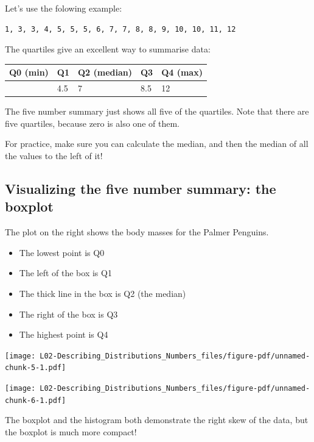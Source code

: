 \documentclass[
  letterpaper,
  DIV=11,
  numbers=noendperiod,
  oneside]{scrreprt}
\providecommand{\tightlist}{%
  \setlength{\itemsep}{0pt}\setlength{\parskip}{0pt}}\usepackage{longtable,booktabs,array}
\begin{document}
Let's use the folowing example:

\begin{verbatim}
1, 3, 3, 4, 5, 5, 5, 6, 7, 7, 8, 8, 9, 10, 10, 11, 12
\end{verbatim}

The quartiles give an excellent way to summarise data:

\begin{longtable}[]{@{}lllll@{}}
\toprule\noalign{}
Q0 (min) & Q1 & Q2 (median) & Q3 & Q4 (max) \\
\midrule\noalign{}
\endhead
\bottomrule\noalign{}
\endlastfoot
1 & 4.5 & 7 & 8.5 & 12 \\
\end{longtable}

The five number summary just shows all five of the quartiles. Note that
there are five quartiles, because zero is also one of them.

For practice, make sure you can calculate the median, and then the
median of all the values to the left of it!

\hypertarget{visualizing-the-five-number-summary-the-boxplot}{%
\subsection{Visualizing the five number summary: the
boxplot}\label{visualizing-the-five-number-summary-the-boxplot}}

\vspace{1cm}

The plot on the right shows the body masses for the Palmer Penguins.

\begin{itemize}
\tightlist
\item
  The lowest point is Q0
\item
  The left of the box is Q1
\item
  The thick line in the box is Q2 (the median)
\item
  The right of the box is Q3
\item
  The highest point is Q4
\end{itemize}

\texttt{[image: L02-Describing\_Distributions\_Numbers\_files/figure-pdf/unnamed-chunk-5-1.pdf]}

\texttt{[image: L02-Describing\_Distributions\_Numbers\_files/figure-pdf/unnamed-chunk-6-1.pdf]}

The boxplot and the histogram both demonstrate the right skew of the
data, but the boxplot is much more compact!
\end{document}
